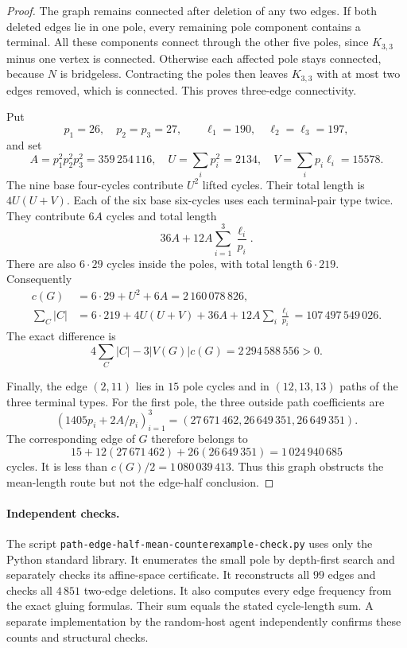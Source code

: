 \begin{proof}
The graph remains connected after deletion of any two edges.
If both deleted edges lie in one pole, every remaining pole component contains a terminal.
All these components connect through the other five poles, since $K_{3,3}$ minus one vertex is connected.
Otherwise each affected pole stays connected, because $N$ is bridgeless.
Contracting the poles then leaves $K_{3,3}$ with at most two edges removed, which is connected.
This proves three-edge connectivity.

Put
\[
 p_1=26,\quad p_2=p_3=27,\qquad
 \ell_1=190,\quad \ell_2=\ell_3=197,
\]
and set
\[
 A=p_1^2p_2^2p_3^2=359\,254\,116,\quad
 U=\sum_i p_i^2=2134,\quad V=\sum_i p_i\ell_i=15578.
\]
The nine base four-cycles contribute $U^2$ lifted cycles.
Their total length is $4U(U+V)$.
Each of the six base six-cycles uses each terminal-pair type twice.
They contribute $6A$ cycles and total length
\[
 36A+12A\sum_{i=1}^3\frac{\ell_i}{p_i}.
\]
There are also $6\cdot29$ cycles inside the poles, with total length $6\cdot219$.
Consequently
\[
\begin{aligned}
 c(G)&=6\cdot29+U^2+6A=2\,160\,078\,826,\\
 \sum_C|C|&=6\cdot219+4U(U+V)+36A
       +12A\sum_i\frac{\ell_i}{p_i}
       =107\,497\,549\,026.
\end{aligned}
\]
The exact difference is
\[
 4\sum_C|C|-3|V(G)|c(G)=2\,294\,588\,556>0.
\]

Finally, the edge $(2,11)$ lies in $15$ pole cycles and in $(12,13,13)$ paths of the three terminal types.
For the first pole, the three outside path coefficients are
\[
 (1405p_i+2A/p_i)_{i=1}^3
   =(27\,671\,462,26\,649\,351,26\,649\,351).
\]
The corresponding edge of $G$ therefore belongs to
\[
 15+12(27\,671\,462)+26(26\,649\,351)=1\,024\,940\,685
\]
cycles.
It is less than $c(G)/2=1\,080\,039\,413$.
Thus this graph obstructs the mean-length route but not the edge-half conclusion.
\end{proof}

\paragraph{Independent checks.}
The script \texttt{path-edge-half-mean-counterexample-check.py} uses only the Python standard library.
It enumerates the small pole by depth-first search and separately checks its affine-space certificate.
It reconstructs all $99$ edges and checks all $4\,851$ two-edge deletions.
It also computes every edge frequency from the exact gluing formulas.
Their sum equals the stated cycle-length sum.
A separate implementation by the random-host agent independently confirms these counts and structural checks.
